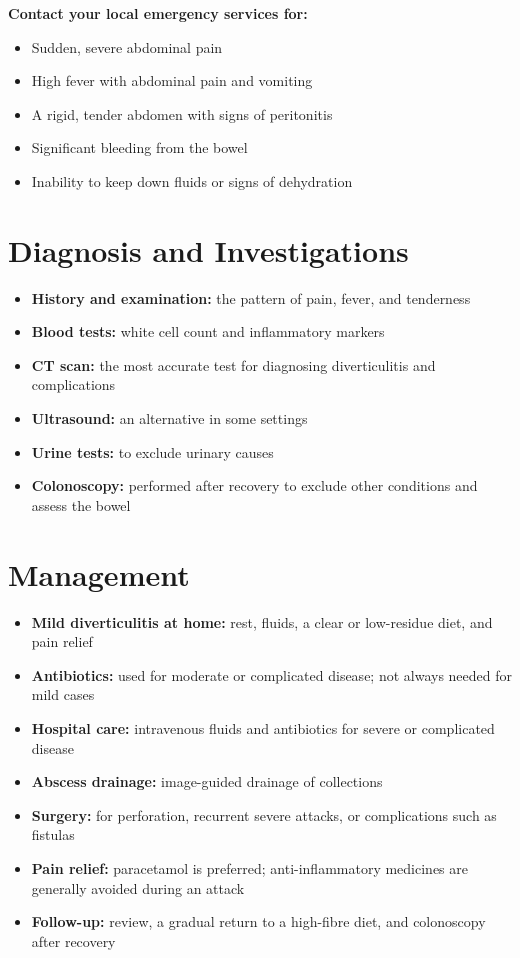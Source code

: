 \textbf{Contact your local emergency services for:}
\begin{itemize}
    \item Sudden, severe abdominal pain
    \item High fever with abdominal pain and vomiting
    \item A rigid, tender abdomen with signs of peritonitis
    \item Significant bleeding from the bowel
    \item Inability to keep down fluids or signs of dehydration
\end{itemize}

\section*{Diagnosis and Investigations}
\begin{itemize}
    \item \textbf{History and examination:} the pattern of pain, fever, and tenderness
    \item \textbf{Blood tests:} white cell count and inflammatory markers
    \item \textbf{CT scan:} the most accurate test for diagnosing diverticulitis and complications
    \item \textbf{Ultrasound:} an alternative in some settings
    \item \textbf{Urine tests:} to exclude urinary causes
    \item \textbf{Colonoscopy:} performed after recovery to exclude other conditions and assess the bowel
\end{itemize}

\section*{Management}
\begin{itemize}
    \item \textbf{Mild diverticulitis at home:} rest, fluids, a clear or low-residue diet, and pain relief
    \item \textbf{Antibiotics:} used for moderate or complicated disease; not always needed for mild cases
    \item \textbf{Hospital care:} intravenous fluids and antibiotics for severe or complicated disease
    \item \textbf{Abscess drainage:} image-guided drainage of collections
    \item \textbf{Surgery:} for perforation, recurrent severe attacks, or complications such as fistulas
    \item \textbf{Pain relief:} paracetamol is preferred; anti-inflammatory medicines are generally avoided during an attack
    \item \textbf{Follow-up:} review, a gradual return to a high-fibre diet, and colonoscopy after recovery
\end{itemize}

